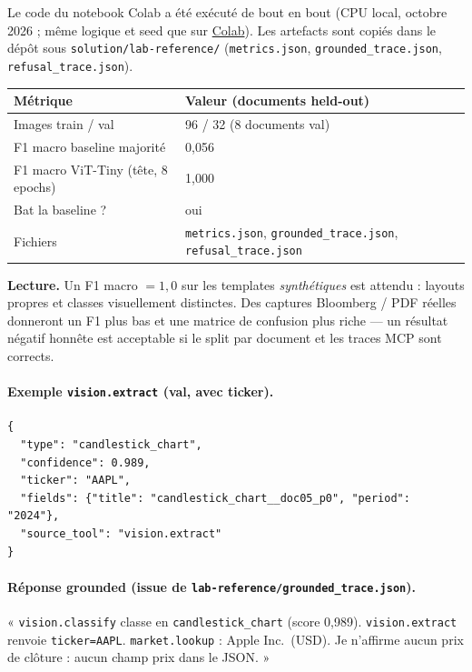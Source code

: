 \documentclass[11pt,a4paper]{article}
\begin{document}
Le code du notebook Colab a été exécuté de bout en bout (CPU local, octobre 2026 ;
même logique et seed que sur
\href{https://colab.research.google.com/github/Amzil-AI/Vision-desk/blob/main/vision_desk_colab.ipynb}{Colab}).
Les artefacts sont copiés dans le dépôt sous \texttt{solution/lab-reference/}
(\texttt{metrics.json}, \texttt{grounded\_trace.json}, \texttt{refusal\_trace.json}).

\begin{center}
\renewcommand{\arraystretch}{1.15}
\begin{tabular}{@{}p{4.2cm}p{10.4cm}@{}}
\toprule
\textbf{Métrique} & \textbf{Valeur (documents held-out)} \\
\midrule
Images train / val & 96 / 32 (8 documents val) \\
F1 macro baseline majorité & 0{,}056 \\
F1 macro ViT-Tiny (tête, 8 epochs) & 1{,}000 \\
Bat la baseline ? & oui \\
Fichiers & \texttt{metrics.json}, \texttt{grounded\_trace.json}, \texttt{refusal\_trace.json} \\
\bottomrule
\end{tabular}
\end{center}

{\color{warn}\textbf{Lecture.}
Un F1 macro $=1{,}0$ sur les templates \emph{synthétiques} est attendu : layouts
propres et classes visuellement distinctes. Des captures Bloomberg / PDF réelles
donneront un F1 plus bas et une matrice de confusion plus riche --- un résultat
négatif honnête est acceptable si le split par document et les traces MCP sont
corrects.}

\paragraph{Exemple \texttt{vision.extract} (val, avec ticker).}
\begin{verbatim}
{
  "type": "candlestick_chart",
  "confidence": 0.989,
  "ticker": "AAPL",
  "fields": {"title": "candlestick_chart__doc05_p0", "period": "2024"},
  "source_tool": "vision.extract"
}
\end{verbatim}

\paragraph{Réponse grounded (issue de \texttt{lab-reference/grounded\_trace.json}).}
« \texttt{vision.classify} classe en \texttt{candlestick\_chart} (score 0{,}989).
\texttt{vision.extract} renvoie \texttt{ticker=AAPL}. \texttt{market.lookup} :
Apple Inc.\ (USD). Je n'affirme aucun prix de clôture : aucun champ prix dans le JSON. »
\end{document}
